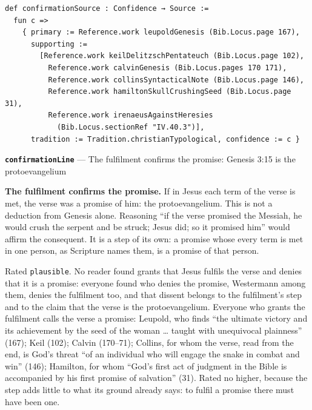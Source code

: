 \documentclass[11pt]{article}
\begin{document}
{\small\begin{verbatim}
def confirmationSource : Confidence → Source :=
  fun c =>
    { primary := Reference.work leupoldGenesis (Bib.Locus.page 167),
      supporting :=
        [Reference.work keilDelitzschPentateuch (Bib.Locus.page 102),
          Reference.work calvinGenesis (Bib.Locus.pages 170 171),
          Reference.work collinsSyntacticalNote (Bib.Locus.page 146),
          Reference.work hamiltonSkullCrushingSeed (Bib.Locus.page 31),
          Reference.work irenaeusAgainstHeresies
            (Bib.Locus.sectionRef "IV.40.3")],
      tradition := Tradition.christianTypological, confidence := c }
\end{verbatim}}
\par\medskip\noindent\textbf{\texttt{confirmation\allowbreak{}Line}} --- The fulfilment confirms the promise: Genesis 3:15 is the protoevangelium\par\nobreak\noindent
\textbf{The fulfilment confirms the promise.} If in Jesus each term of the verse is met, the verse was a promise of him: the protoevangelium. This is not a deduction from Genesis alone. Reasoning “if the verse promised the Messiah, he would crush the serpent and be struck; Jesus did; so it promised him” would affirm the consequent. It is a step of its own: a promise whose every term is met in one person, as Scripture names them, is a promise of that person.

Rated \texttt{plausible}. No reader found grants that Jesus fulfils the verse and denies that it is a promise: everyone found who denies the promise, Westermann among them, denies the fulfilment too, and that dissent belongs to the fulfilment’s step and to the claim that the verse is the protoevangelium. Everyone who grants the fulfilment calls the verse a promise: Leupold, who finds “the ultimate victory and its achievement by the seed of the woman … taught with unequivocal plainness” (167); Keil (102); Calvin (170–71); Collins, for whom the verse, read from the end, is God’s threat “of an individual who will engage the snake in combat and win” (146); Hamilton, for whom “God’s first act of judgment in the Bible is accompanied by his first promise of salvation” (31). Rated no higher, because the step adds little to what its ground already says: to fulfil a promise there must have been one.
\end{document}
